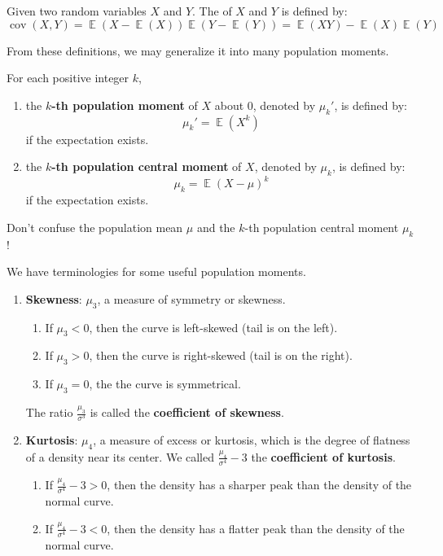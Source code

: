 \documentclass{huhtakm-template-book-v2}
\DeclareMathOperator{\E}{\mathbb{E}}
\DeclareMathOperator{\cov}{cov}
\begin{document}
\begin{defn}
	Given two random variables $X$ and $Y$. The  of $X$ and $Y$ is defined by:
	\begin{equation*}
		\cov(X,Y)=\E(X-\E(X))\E(Y-\E(Y))=\E(XY)-\E(X)\E(Y)
	\end{equation*}
\end{defn}

\newpage
From these definitions, we may generalize it into many population moments.
\begin{defn}
	For each positive integer $k$, 
	\begin{enumerate}
		\item the \textbf{$k$-th population moment} of $X$ about $0$, denoted by $\mu_{k}'$, is defined by:
		\begin{equation*}
			\mu_{k}'=\E(X^{k})
		\end{equation*}
		if the expectation exists.
		\item the \textbf{$k$-th population central moment} of $X$, denoted by $\mu_{k}$, is defined by:
		\begin{equation*}
			\mu_{k}=\E(X-\mu)^{k}
		\end{equation*}
		if the expectation exists.
	\end{enumerate}
\end{defn}
\begin{rem}
	Don't confuse the population mean $\mu$ and the $k$-th population central moment $\mu_{k}$!
\end{rem}
\begin{eg}
	We have terminologies for some useful population moments.
	\begin{enumerate}
		\item \textbf{Skewness}: $\mu_{3}$, a measure of symmetry or skewness.
		\begin{enumerate}
			\item If $\mu_{3}<0$, then the curve is left-skewed (tail is on the left).
			\item If $\mu_{3}>0$, then the curve is right-skewed (tail is on the right).
			\item If $\mu_{3}=0$, the the curve is symmetrical.
		\end{enumerate}
		The ratio $\frac{\mu_{3}}{\sigma^{3}}$ is called the \textbf{coefficient of skewness}.
		\item \textbf{Kurtosis}: $\mu_{4}$, a measure of excess or kurtosis, which is the degree of flatness of a density near its center. We called $\frac{\mu_{4}}{\sigma^{4}}-3$ the \textbf{coefficient of kurtosis}.
		\begin{enumerate}
			\item If $\frac{\mu_{4}}{\sigma^{4}}-3>0$, then the density has a sharper peak than the density of the normal curve.
			\item If $\frac{\mu_{4}}{\sigma^{4}}-3<0$, then the density has a flatter peak than the density of the normal curve.
		\end{enumerate}
	\end{enumerate}
\end{eg}
\end{document}

